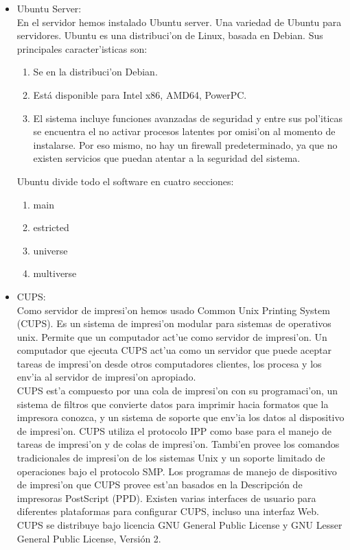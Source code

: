 \begin{itemize}
\item Ubuntu Server:\bigskip \\ En el servidor hemos instalado Ubuntu server. Una variedad de Ubuntu para servidores. Ubuntu es una distribuci'on de Linux, basada en Debian. Sus principales caracter'isticas son:
\begin{enumerate}
	\item Se en la distribuci'on Debian.
	\item Está disponible para Intel x86, AMD64, PowerPC.
	\item El sistema incluye funciones avanzadas de seguridad y entre sus pol'iticas se encuentra el no activar procesos latentes por omisi'on al momento de instalarse. Por eso mismo, no hay un firewall predeterminado, ya que no existen servicios que puedan atentar a la seguridad del sistema.
\end{enumerate}

Ubuntu divide todo el software en cuatro secciones:
\begin{enumerate}
	\item main 
	\item estricted
	\item universe
	\item multiverse
\end{enumerate}

\item CUPS: \bigskip \\ Como servidor de impresi'on hemos usado Common Unix Printing System (CUPS). Es un sistema de impresi'on modular para sistemas de operativos unix. Permite que un computador act'ue como servidor de impresi'on. Un computador que ejecuta CUPS act'ua como un servidor que puede aceptar tareas de impresi'on desde otros computadores clientes, los procesa y los env'ia al servidor de impresi'on apropiado. \bigskip \\ CUPS est'a compuesto por una cola de impresi'on con su programaci'on, un sistema de filtros que convierte datos para imprimir hacia formatos que la impresora conozca, y un sistema de soporte que env'ia los datos al dispositivo de impresi'on. CUPS utiliza el protocolo IPP como base para el manejo de tareas de impresi'on y de colas de impresi'on. Tambi'en provee los comandos tradicionales de impresi'on de los sistemas Unix y un soporte limitado de operaciones bajo el protocolo SMP. Los programas de manejo de dispositivo de impresi'on que CUPS provee est'an basados en la Descripción de impresoras PostScript (PPD). Existen varias interfaces de usuario para diferentes plataformas para configurar CUPS, incluso una interfaz Web. CUPS se distribuye bajo licencia GNU General Public License y GNU Lesser General Public License, Versión 2.
\end{itemize}